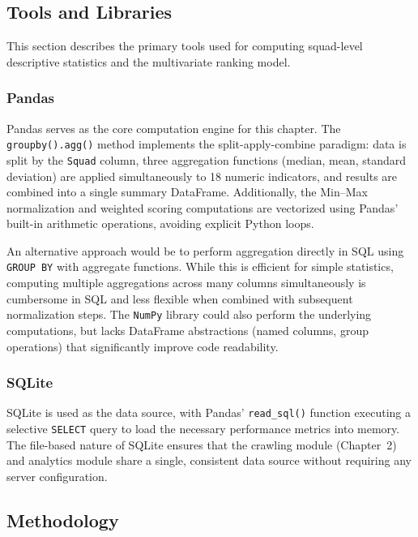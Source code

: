 \documentclass[a4paper,12pt]{report}
\begin{document}
\subsection{Tools and Libraries}

This section describes the primary tools used for computing squad-level descriptive statistics and the multivariate ranking model.

\subsubsection{Pandas}

Pandas serves as the core computation engine for this chapter. The \texttt{groupby().}\allowbreak\texttt{agg()} method implements the split-apply-combine paradigm: data is split by the \texttt{Squad} column, three aggregation functions (median, mean, standard deviation) are applied simultaneously to 18 numeric indicators, and results are combined into a single summary DataFrame. Additionally, the Min--Max normalization and weighted scoring computations are vectorized using Pandas' built-in arithmetic operations, avoiding explicit Python loops.

An alternative approach would be to perform aggregation directly in SQL using \texttt{GROUP BY} with aggregate functions. While this is efficient for simple statistics, computing multiple aggregations across many columns simultaneously is cumbersome in SQL and less flexible when combined with subsequent normalization steps. The \texttt{NumPy} library could also perform the underlying computations, but lacks DataFrame abstractions (named columns, group operations) that significantly improve code readability.

\subsubsection{SQLite}

SQLite is used as the data source, with Pandas' \texttt{read\_sql()} function executing a selective \texttt{SELECT} query to load the necessary performance metrics into memory. The file-based nature of SQLite ensures that the crawling module (Chapter~2) and analytics module share a single, consistent data source without requiring any server configuration.

\subsection{Methodology}
\end{document}
